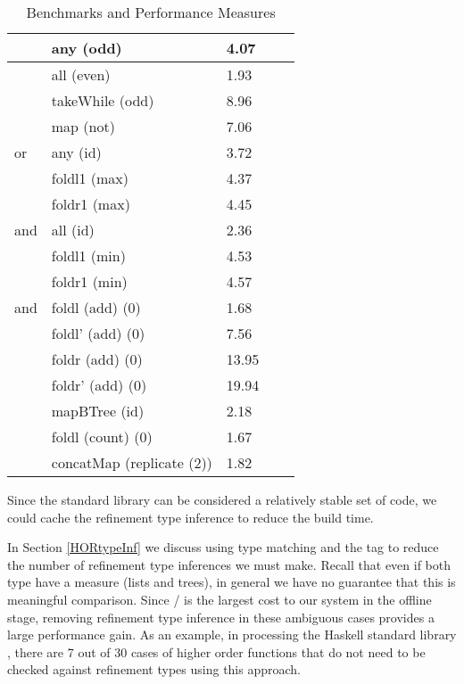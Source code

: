 \begin{table*}[t]
  \centering
  \begin{tabular}{|lllll|}
     & any (odd)        & 4.07   &  &  \\
    \hline

     & all (even)       & 1.93   &  &  \\
     \hline
    
     & takeWhile (odd)  & 8.96   &  &  \\
     \hline
    
     & map (not)        & 7.06   &  &  \\
     \hline
    
    or  & any (id)      & 3.72   &  &  \\
        & foldl1 (max)  & 4.37   &  &  \\
        & foldr1 (max)  & 4.45   &  &  \\
     \hline
    
    and & all (id)      & 2.36   &  &  \\
        & foldl1 (min)  & 4.53   &  &  \\
        & foldr1 (min)  & 4.57   &  &  \\
     \hline
    
    and & foldl  (add) (0)   & 1.68   &  &  \\
        & foldl' (add) (0)   & 7.56   &  &  \\
        & foldr  (add) (0)   & 13.95  &  &  \\
        & foldr' (add) (0)   & 19.94  &  &  \\
    \hline
    
        & mapBTree (id)      & 2.18   &  &  \\
    \hline

    & foldl (count) (0)  & 1.67   &  &  \\
    \hline

    &  concatMap (replicate (2))  & 1.82   &  &  \\
  \end{tabular}
  \caption{Benchmarks and Performance Measures}
  \label{tab:benchmarks}
\end{table*}

Since the standard library can be considered a relatively stable set of code, we could cache the refinement type inference to reduce the build time.

In Section \ref{HORtypeInf} we discuss using type matching and the  tag to reduce the number of refinement type inferences we must make. 
Recall that even if both type have a measure (lists and trees), in general we have no guarantee that this is meaningful comparison.
Since \lhask/ is the largest cost to our system in the offline stage, removing refinement type inference in these ambiguous cases provides a large performance gain.
As an example, in processing the Haskell standard library , there are 7 out of 30 cases of higher order functions that do not need to be checked against refinement types using this approach.

